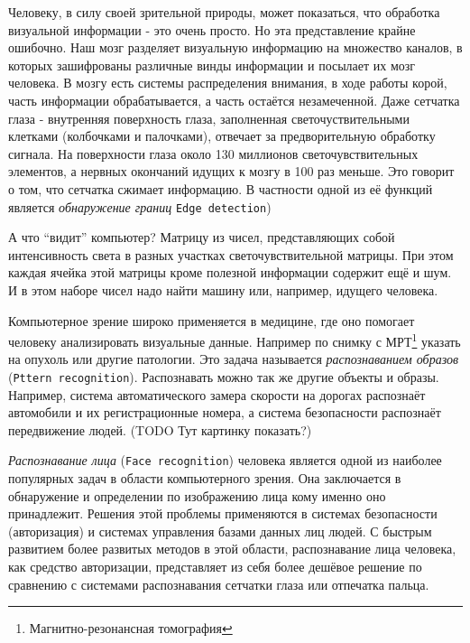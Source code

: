 \documentclass[12pt]{report}
\begin{document}
Человеку, в силу своей зрительной природы, может показаться, что обработка визуальной информации - это очень просто. Но эта представление крайне ошибочно. Наш мозг разделяет визуальную информацию на множество каналов, в которых зашифрованы различные винды информации и посылает их мозг человека. В мозгу есть системы распределения внимания, в ходе работы корой, часть информации обрабатывается, а часть остаётся незамеченной. \citep{bradski2008learning} Даже сетчатка глаза - внутренняя поверхность глаза, заполненная светочуствительными клетками (колбочками и палочками), отвечает за предворительную обработку сигнала. На поверхности глаза около 130 миллионов светочувствительных элементов, а нервных окончаний идущих к мозгу в 100 раз меньше. Это говорит о том, что сетчатка сжимает информацию. В частности одной из её функций является \emph{обнаружение границ} \texttt{Edge detection}) \citep{RetinaOnWiki}

А что ``видит'' компьютер? Матрицу из чисел, представляющих собой интенсивность света в разных участках светочувствительной матрицы. При этом каждая ячейка этой матрицы кроме полезной информации содержит ещё и шум. И в этом наборе чисел надо найти машину или, например, идущего человека.

Компьютерное зрение широко применяется в медицине, где оно помогает человеку анализировать визуальные данные. Например по снимку с МРТ\footnote{Магнитно-резонансная томография} указать на опухоль или другие патологии. Это задача называется \emph{распознаванием образов} (\texttt{Pttern recognition}). Распознавать можно так же другие объекты и образы. Например, система автоматического замера скорости на дорогах распознаёт автомобили и их регистрационные номера, а система безопасности распознаёт передвижение людей.
(TODO Тут картинку показать?)


\emph{Распознавание лица} (\texttt{Face recognition}) человека является одной из наиболее популярных задач в области компьютерного зрения. Она заключается в обнаружение и определении по изображению лица кому именно оно принадлежит. Решения этой проблемы применяются в системах безопасности (авторизация) и системах управления базами данных лиц людей. %
С быстрым развитием более развитых методов в этой области, распознавание лица человека, как средство авторизации, представляет из себя более дешёвое решение по сравнению с системами распознавания сетчатки глаза или отпечатка пальца. \citep{kumar2006efficient}
\end{document}
